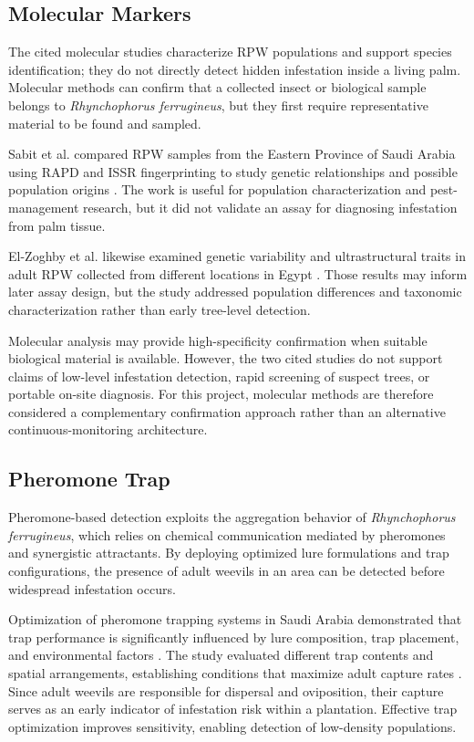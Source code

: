 \documentclass[12pt,a4paper,oneside]{memoir}
\begin{document}
\subsection{Molecular Markers}

The cited molecular studies characterize RPW populations and support species identification; they do not directly detect hidden infestation inside a living palm. Molecular methods can confirm that a collected insect or biological sample belongs to \textit{Rhynchophorus ferrugineus}, but they first require representative material to be found and sampled.

Sabit et al. compared RPW samples from the Eastern Province of Saudi Arabia using RAPD and ISSR fingerprinting to study genetic relationships and possible population origins \cite{sabit2021}. The work is useful for population characterization and pest-management research, but it did not validate an assay for diagnosing infestation from palm tissue.

El-Zoghby et al. likewise examined genetic variability and ultrastructural traits in adult RPW collected from different locations in Egypt \cite{elzoghby2022}. Those results may inform later assay design, but the study addressed population differences and taxonomic characterization rather than early tree-level detection.

Molecular analysis may provide high-specificity confirmation when suitable biological material is available. However, the two cited studies do not support claims of low-level infestation detection, rapid screening of suspect trees, or portable on-site diagnosis. For this project, molecular methods are therefore considered a complementary confirmation approach rather than an alternative continuous-monitoring architecture.

\subsection{Pheromone Trap}

Pheromone-based detection exploits the aggregation behavior of \textit{Rhynchophorus ferrugineus}, which relies on chemical communication mediated by pheromones and synergistic attractants. By deploying optimized lure formulations and trap configurations, the presence of adult weevils in an area can be detected before widespread infestation occurs.

Optimization of pheromone trapping systems in Saudi Arabia demonstrated that trap performance is significantly influenced by lure composition, trap placement, and environmental factors \cite{shukla2018}. The study evaluated different trap contents and spatial arrangements, establishing conditions that maximize adult capture rates \cite{shukla2018}. Since adult weevils are responsible for dispersal and oviposition, their capture serves as an early indicator of infestation risk within a plantation. Effective trap optimization improves sensitivity, enabling detection of low-density populations.
\end{document}
